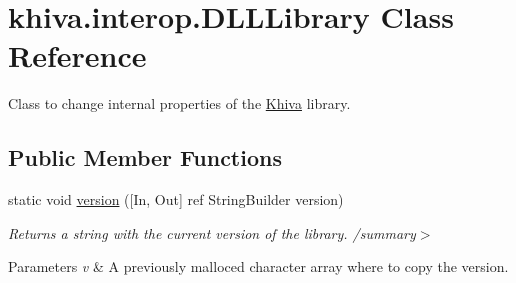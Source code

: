 \hypertarget{classkhiva_1_1interop_1_1_d_l_l_library}{}\section{khiva.\+interop.\+D\+L\+L\+Library Class Reference}
\label{classkhiva_1_1interop_1_1_d_l_l_library}


Class to change internal properties of the \mbox{\hyperlink{classkhiva_1_1_khiva}{Khiva}} library.  


\subsection*{Public Member Functions}
\begin{DoxyCompactItemize}
\item 
static void \mbox{\hyperlink{classkhiva_1_1interop_1_1_d_l_l_library_a143d6d635c6fc596dcad11bfa72bce64}{version}} (\mbox{[}In, Out\mbox{]} ref String\+Builder version)
\begin{DoxyCompactList}\small\item\em Returns a string with the current version of the library. /summary$>$ 
\begin{DoxyParams}{Parameters}
{\em v} & A previously malloced character array where to copy the version.\\
\hline
\end{DoxyParams}
\end{DoxyCompactList}\end{DoxyCompactItemize}
